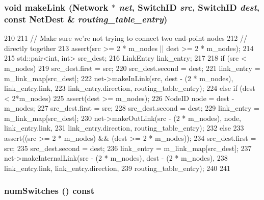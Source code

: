 \hypertarget{classTopology_a00d2816a2478d6f300159f8cefe12354}{
\subsubsection[{makeLink}]{\setlength{\rightskip}{0pt plus 5cm}void makeLink ({\bf Network} $\ast$ {\em net}, \/  {\bf SwitchID} {\em src}, \/  {\bf SwitchID} {\em dest}, \/  const {\bf NetDest} \& {\em routing\_\-table\_\-entry})}}
\label{classTopology_a00d2816a2478d6f300159f8cefe12354}



\begin{DoxyCode}
210 {
211     // Make sure we're not trying to connect two end-point nodes
212     // directly together
213     assert(src >= 2 * m_nodes || dest >= 2 * m_nodes);
214 
215     std::pair<int, int> src_dest;
216     LinkEntry link_entry;    
217 
218     if (src < m_nodes) {
219         src_dest.first = src;
220         src_dest.second = dest;
221         link_entry = m_link_map[src_dest];
222         net->makeInLink(src, dest - (2 * m_nodes), link_entry.link,
223                         link_entry.direction, routing_table_entry);
224     } else if (dest < 2*m_nodes) {
225         assert(dest >= m_nodes);
226         NodeID node = dest - m_nodes;
227         src_dest.first = src;
228         src_dest.second = dest;
229         link_entry = m_link_map[src_dest];
230         net->makeOutLink(src - (2 * m_nodes), node, link_entry.link,
231                          link_entry.direction, routing_table_entry);
232     } else {
233         assert((src >= 2 * m_nodes) && (dest >= 2 * m_nodes));
234         src_dest.first = src;
235         src_dest.second = dest;
236         link_entry = m_link_map[src_dest];
237         net->makeInternalLink(src - (2 * m_nodes), dest - (2 * m_nodes),
238                               link_entry.link, link_entry.direction,
239                               routing_table_entry);
240     }
241 }
\end{DoxyCode}
\hypertarget{classTopology_a2a6b2aa79e812a5e4168dc5a670891c0}{
\subsubsection[{numSwitches}]{ numSwitches () const}}
\label{classTopology_a2a6b2aa79e812a5e4168dc5a670891c0}



